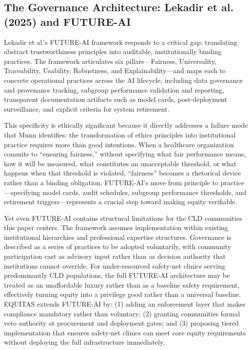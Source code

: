 \documentclass[12pt,letterpaper]{article}
\begin{document}
\subsection{The Governance Architecture: Lekadir et al. (2025) and FUTURE-AI}

Lekadir et al.'s FUTURE-AI framework responds to a critical gap: translating abstract trustworthiness principles into auditable, institutionally binding practices. The framework articulates six pillars---Fairness, Universality, Traceability, Usability, Robustness, and Explainability---and maps each to concrete operational practices across the AI lifecycle, including data governance and provenance tracking, subgroup performance validation and reporting, transparent documentation artifacts such as model cards, post-deployment surveillance, and explicit criteria for system retirement.\cite{lekadir2025}

This specificity is ethically significant because it directly addresses a failure mode that Munn identifies: the transformation of ethics principles into institutional practice requires more than good intentions. When a healthcare organization commits to ``ensuring fairness,'' without specifying what fair performance means, how it will be measured, what constitutes an unacceptable threshold, or what happens when that threshold is violated, ``fairness'' becomes a rhetorical device rather than a binding obligation.\cite{lekadir2025} FUTURE-AI's move from principle to practice---specifying model cards, audit schedules, subgroup performance thresholds, and retirement triggers---represents a crucial step toward making equity verifiable.

Yet even FUTURE-AI contains structural limitations for the CLD communities this paper centers. The framework assumes implementation within existing institutional hierarchies and professional expertise structures. Governance is described as a series of practices to be adopted voluntarily, with community participation cast as advisory input rather than as decision authority that institutions cannot override.\cite{lekadir2025} For under-resourced safety-net clinics serving predominantly CLD populations, the full FUTURE-AI architecture may be treated as an unaffordable luxury rather than as a baseline safety requirement, effectively turning equity into a privilege good rather than a universal baseline.\cite{lekadir2025} EQUITAS extends FUTURE-AI by: (1) adding an enforcement layer that makes compliance mandatory rather than voluntary; (2) granting communities formal veto authority at procurement and deployment gates; and (3) proposing tiered implementation that ensures safety-net clinics can meet core equity requirements without deploying the full infrastructure immediately.
\end{document}
